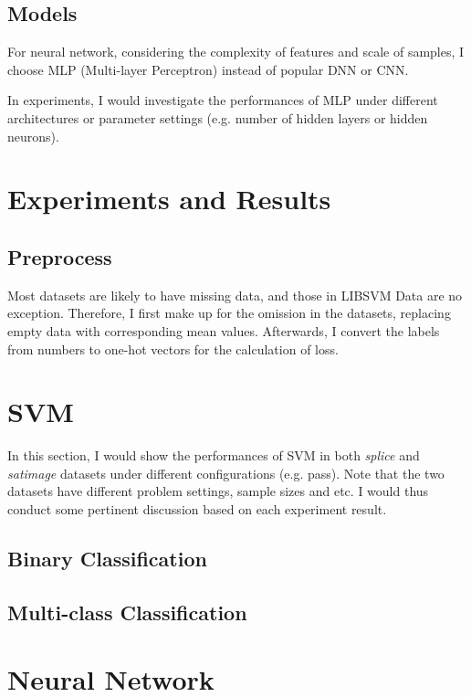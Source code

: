 \documentclass[12pt,a4paper]{article}
\theoremstyle{definition}
\begin{document}
\subsection{Models}

For neural network, considering the complexity of features and scale of samples, I choose MLP (Multi-layer Perceptron) instead of popular DNN or CNN.

\vspace{0.01\linewidth}
In experiments, I would investigate the performances of MLP under different architectures or parameter settings (e.g. number of hidden layers or hidden neurons).

\section{Experiments and Results}

\subsection{Preprocess}

Most datasets are likely to have missing data, and those in LIBSVM Data are no exception. Therefore, I first make up for the omission in the datasets, replacing empty data with corresponding mean values. Afterwards, I convert the labels from numbers to one-hot vectors for the calculation of loss.

\section{SVM}
\label{sec:svm}

In this section, I would show the performances of SVM in both \textit{splice} and \textit{satimage} datasets under different configurations (e.g. pass). Note that the two datasets have different problem settings, sample sizes and etc. I would thus conduct some pertinent discussion based on each experiment result.

\subsection{Binary Classification}

\subsection{Multi-class Classification}

\section{Neural Network}
\end{document}

